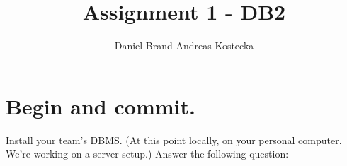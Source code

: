 \documentclass{vldb}
\begin{document}

\title{Assignment 1 - DB2}



\author{
\alignauthor Daniel Brand
\alignauthor Andreas Kostecka
}


\maketitle

\section{Begin and commit.}

Install your team's DBMS. (At this point locally, on your personal computer. We're working on a server setup.) Answer the following question:
\end{document}
